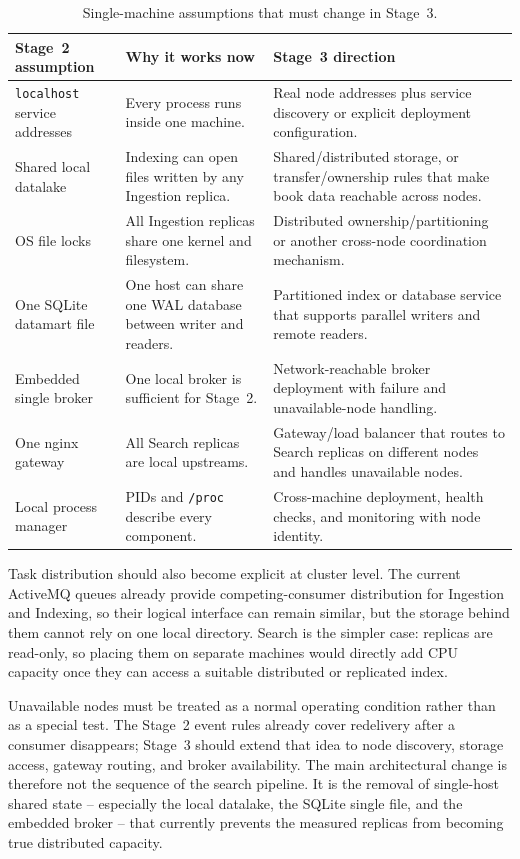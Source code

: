 \documentclass[12pt,a4paper]{article}
\begin{document}
\begin{table}[H]
    \centering
    \caption{Single-machine assumptions that must change in Stage~3.}
    \label{tab:stage3}
    \small
    \begin{tabularx}{\textwidth}{p{} p{} X}
        \toprule
        \textbf{Stage~2 assumption} & \textbf{Why it works now} & \textbf{Stage~3 direction} \\
        \midrule
        \texttt{localhost} service addresses & Every process runs inside one machine. & Real node addresses plus service discovery or explicit deployment configuration. \\
        Shared local datalake & Indexing can open files written by any Ingestion replica. & Shared/distributed storage, or transfer/ownership rules that make book data reachable across nodes. \\
        OS file locks & All Ingestion replicas share one kernel and filesystem. & Distributed ownership/partitioning or another cross-node coordination mechanism. \\
        One SQLite datamart file & One host can share one WAL database between writer and readers. & Partitioned index or database service that supports parallel writers and remote readers. \\
        Embedded single broker & One local broker is sufficient for Stage~2. & Network-reachable broker deployment with failure and unavailable-node handling. \\
        One nginx gateway & All Search replicas are local upstreams. & Gateway/load balancer that routes to Search replicas on different nodes and handles unavailable nodes. \\
        Local process manager & PIDs and \texttt{/proc} describe every component. & Cross-machine deployment, health checks, and monitoring with node identity. \\
        \bottomrule
    \end{tabularx}
\end{table}

Task distribution should also become explicit at cluster level. The current ActiveMQ queues already
provide competing-consumer distribution for Ingestion and Indexing, so their logical interface can
remain similar, but the storage behind them cannot rely on one local directory. Search is the
simpler case: replicas are read-only, so placing them on separate machines would directly add CPU
capacity once they can access a suitable distributed or replicated index.

Unavailable nodes must be treated as a normal operating condition rather than as a special test.
The Stage~2 event rules already cover redelivery after a consumer disappears; Stage~3 should extend
that idea to node discovery, storage access, gateway routing, and broker availability. The main
architectural change is therefore not the sequence of the search pipeline. It is the removal of
single-host shared state -- especially the local datalake, the SQLite single file, and the embedded
broker -- that currently prevents the measured replicas from becoming true distributed capacity.
\end{document}
